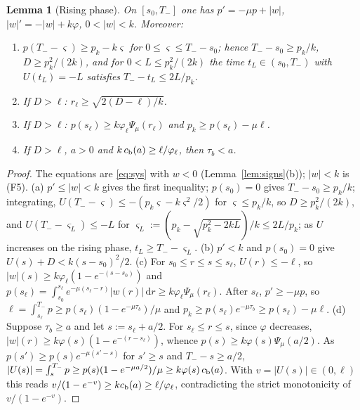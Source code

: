 \documentclass[11pt,a4paper]{article}
\newtheorem{lemma}[theorem]{Lemma}
\theoremstyle{remark}\newtheorem{remark}[theorem]{Remark}
\newcommand{\dd}{\,\mathrm d}
\begin{document}
\begin{lemma}[Rising phase]\label{lem:rise}
On $[s_0,T_-]$ one has $p'=-\mu p+|w|$, $|w|'=-|w|+k\varphi$, $0<|w|<k$. Moreover:
\begin{enumerate}[label=\textup{(\alph*)}]
\item $p(T_--\varsigma)\ge p_k-k\varsigma$ for $0\le\varsigma\le T_--s_0$; hence $T_--s_0\ge p_k/k$,
$D\ge p_k^2/(2k)$, and for $0<L\le p_k^2/(2k)$ the time $t_L\in(s_0,T_-)$ with $U(t_L)=-L$ satisfies
$T_--t_L\le 2L/p_k$.
\item If $D>\ell$: $r_\ell\ge\sqrt{2(D-\ell)/k}$.
\item If $D>\ell$: $p(s_\ell)\ge k\varphi_\ell\Psi_\mu(r_\ell)$ and $p_k\ge p(s_\ell)-\mu\ell$.
\item If $D>\ell$, $a>0$ and $k\,c_{\rm b}(a)\ge\ell/\varphi_\ell$, then $\tau_b<a$.
\end{enumerate}
\end{lemma}
\begin{proof}
The equations are \eqref{eq:sys} with $w<0$ (Lemma~\ref{lem:signs}(b)); $|w|<k$ is (F5).
(a) $p'\le|w|<k$ gives the first inequality; $p(s_0)=0$ gives $T_--s_0\ge p_k/k$; integrating,
$U(T_--\varsigma)\le-(p_k\varsigma-k\varsigma^2/2)$ for $\varsigma\le p_k/k$, so $D\ge p_k^2/(2k)$, and
$U(T_--\varsigma_L)\le-L$ for $\varsigma_L:=(p_k-\sqrt{p_k^2-2kL})/k\le 2L/p_k$; as $U$ increases on the
rising phase, $t_L\ge T_--\varsigma_L$.
(b) $p'<k$ and $p(s_0)=0$ give $U(s)+D<k(s-s_0)^2/2$.
(c) For $s_0\le r\le s\le s_\ell$, $U(r)\le-\ell$, so $|w|(s)\ge k\varphi_\ell(1-e^{-(s-s_0)})$ and
$p(s_\ell)=\int_{s_0}^{s_\ell}e^{-\mu(s_\ell-r)}|w(r)|\dd r\ge k\varphi_\ell\Psi_\mu(r_\ell)$. After
$s_\ell$, $p'\ge-\mu p$, so $\ell=\int_{s_\ell}^{T_-}p\ge p(s_\ell)(1-e^{-\mu\tau_b})/\mu$ and
$p_k\ge p(s_\ell)e^{-\mu\tau_b}\ge p(s_\ell)-\mu\ell$.
(d) Suppose $\tau_b\ge a$ and let $s:=s_\ell+a/2$. For $s_\ell\le r\le s$, since $\varphi$ decreases,
$|w|(r)\ge k\varphi(s)(1-e^{-(r-s_\ell)})$, whence $p(s)\ge k\varphi(s)\Psi_\mu(a/2)$. As
$p(s')\ge p(s)e^{-\mu(s'-s)}$ for $s'\ge s$ and $T_--s\ge a/2$,
$|U(s)|=\int_s^{T_-}p\ge p(s)(1-e^{-\mu a/2})/\mu\ge k\varphi(s)\,c_{\rm b}(a)$. With
$v=|U(s)|\in(0,\ell)$ this reads $v/(1-e^{-v})\ge kc_{\rm b}(a)\ge\ell/\varphi_\ell$, contradicting the
strict monotonicity of $v/(1-e^{-v})$.
\end{proof}
\end{document}
